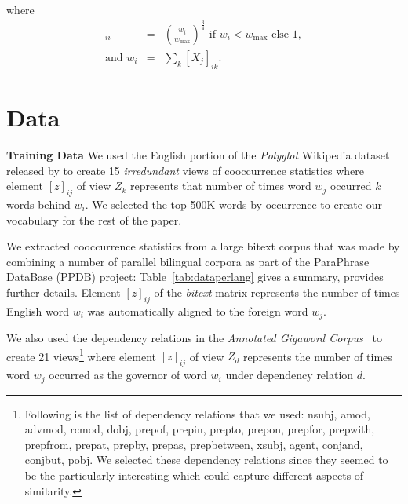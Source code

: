 \documentclass[11pt]{article}
\newcommand{\xline}[0]{\noindent\underline{\makebox[0.1cm][l]{}}}
\newcommand{\remove}[1]{}
\begin{document}
where
\begin{eqnarray}
[W_j]_{ii} &=& \left(\frac{w_i}{w_{\max}}\right)^{\frac{3}{4}} \text{ if } w_i <
  w_{\max} \text{ else } 1, \nonumber \\
  \text{and } w_i &=&  \sum_k [X_j]_{ik}. \nonumber
\end{eqnarray}


\section{Data}
\label{sec:data}

\noindent\textbf{Training Data} We used the English portion of the
\textit{Polyglot} Wikipedia dataset released by
 to create 15 \emph{irredundant} views of
cooccurrence statistics where element $[z]_{ij}$ of view $Z_k$
represents that number of times word $w_j$ occurred $k$ words behind
$w_i$. We selected the top 500K words by occurrence to create our
vocabulary for the rest of the paper.


We extracted cooccurrence statistics from a large bitext corpus that
was made by combining a number of parallel bilingual corpora as part
of the ParaPhrase DataBase (PPDB) project: Table~\ref{tab:dataperlang}
gives a summary,  provides further
details. Element $[z]_{ij}$ of the \textit{bitext} matrix represents
the number of times English word $w_i$ was automatically aligned to
the foreign word $w_j$.

We also used the dependency relations in the \textit{Annotated
  Gigaword Corpus}~\cite{annotatedGigaword12} to create 21
views\footnote{Following is the list of dependency relations that we
  used: nsubj, amod, advmod, rcmod, dobj, prep\xline{}of,
  prep\xline{}in, prep\xline{}to, prep\xline{}on, prep\xline{}for,
  prep\xline{}with, prep\xline{}from, prep\xline{}at, prep\xline{}by,
  prep\xline{}as, prep\xline{}between, xsubj, agent, conj\xline{}and,
  conj\xline{}but, pobj. We selected these dependency relations since
  they seemed to be the particularly interesting which could capture
  different aspects of similarity.}  where element $[z]_{ij}$ of view
$Z_d$ represents the number of times word $w_j$ occurred
as the governor of word $w_i$ under dependency relation $d$.
\end{document}
